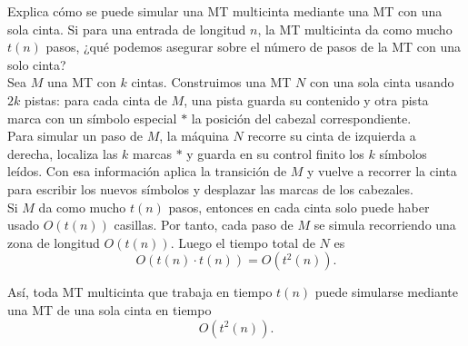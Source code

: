\documentclass[12pt]{article}
\begin{document}
    \begin{ejercicio}[1.5 puntos]
        Explica cómo se puede simular una MT multicinta mediante una MT con una sola cinta. Si para una entrada de longitud $n$, 
        la MT multicinta da como mucho $t(n)$ pasos, ¿qué podemos asegurar sobre el número de pasos de la MT con una solo cinta? \\

        Sea $M$ una MT con $k$ cintas. Construimos una MT $N$ con una sola cinta usando $2k$ pistas: para cada cinta de $M$, una pista 
        guarda su contenido y otra pista marca con un símbolo especial $*$ la posición del cabezal correspondiente. \\

        Para simular un paso de $M$, la máquina $N$ recorre su cinta de izquierda a derecha, localiza las $k$ marcas $*$ y guarda en 
        su control finito los $k$ símbolos leídos. Con esa información aplica la transición de $M$ y vuelve a recorrer la cinta para 
        escribir los nuevos símbolos y desplazar las marcas de los cabezales. \\

        Si $M$ da como mucho $t(n)$ pasos, entonces en cada cinta solo puede haber usado $O(t(n))$ casillas. Por tanto, cada paso de $M$ se simula recorriendo una zona de longitud $O(t(n))$. Luego el tiempo total de $N$ es
        $$
        O(t(n)\cdot t(n))=O(t^2(n)).
        $$

        Así, toda MT multicinta que trabaja en tiempo $t(n)$ puede simularse mediante una MT de una sola cinta en tiempo
        $$
        O(t^2(n)).
        $$
    \end{ejercicio}
\end{document}
